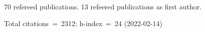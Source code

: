 70 refereed publications. 13 refeered publications as first author.

Total citations~=~2312; h-index~=~24 (2022-02-14)